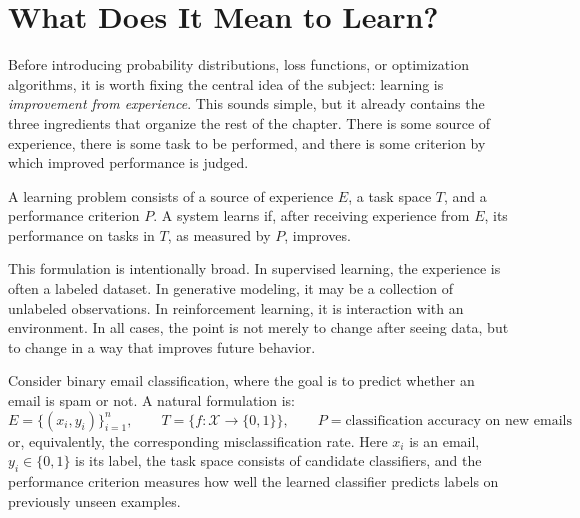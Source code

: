 
\section{What Does It Mean to Learn?}

Before introducing probability distributions, loss functions, or optimization algorithms, it is worth fixing the central idea of the subject: learning is \emph{improvement from experience}. This sounds simple, but it already contains the three ingredients that organize the rest of the chapter. There is some source of experience, there is some task to be performed, and there is some criterion by which improved performance is judged.

\begin{definition}
A learning problem consists of a source of experience $E$, a task space $T$, and a performance criterion $P$. A system learns if, after receiving experience from $E$, its performance on tasks in $T$, as measured by $P$, improves.
\end{definition}

This formulation is intentionally broad. In supervised learning, the experience is often a labeled dataset. In generative modeling, it may be a collection of unlabeled observations. In reinforcement learning, it is interaction with an environment. In all cases, the point is not merely to change after seeing data, but to change in a way that improves future behavior.

\begin{example}
Consider binary email classification, where the goal is to predict whether an email is spam or not. A natural formulation is:
\[
E=\{(x_i,y_i)\}_{i=1}^n,
\qquad
T=\{f:\mathcal X\to\{0,1\}\},
\qquad
P=\text{classification accuracy on new emails}
\]
or, equivalently, the corresponding misclassification rate. Here $x_i$ is an email, $y_i\in\{0,1\}$ is its label, the task space consists of candidate classifiers, and the performance criterion measures how well the learned classifier predicts labels on previously unseen examples.
\end{example}

